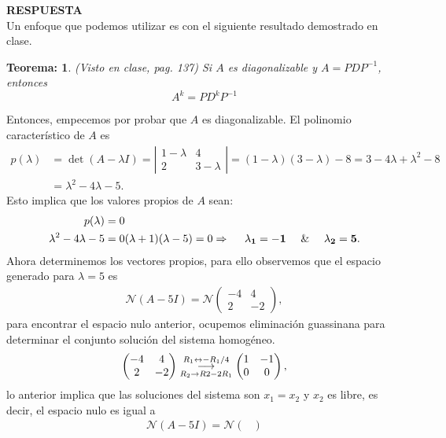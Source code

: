 \documentclass[11pt,letterpaper]{article}
\newcommand{\mcN}{\mathcal{N}}
\newcommand{\res}{\textbf{RESPUESTA}\\}
\newcommand{\grstep}[2][\relax]{%
   \ensuremath{\mathrel{
       {\mathop{\longrightarrow}\limits^{#2\mathstrut}_{
                                     \begin{subarray}{l} #1 \end{subarray}}}}}}
\newtheorem{thmt}{Teorema:}
\begin{document}
\begin{enumerate}
\res Un enfoque que podemos utilizar es con el siguiente resultado demostrado en clase.
\begin{framed}
    \begin{thmt} \label{t_potencia_diagonalizable}
	(Visto en clase, pag. 137) Si $A$ es diagonalizable y $A=PDP^{-1}$, entonces $$A^k=PD^kP^{-1}$$ 
    \end{thmt}
\end{framed}
Entonces, empecemos por probar que $A$ es diagonalizable. El polinomio característico de $A$ es
\begin{align*}
p(\lambda) &= \det (A-\lambda I)=\left|\begin{array}{cc}
1-\lambda &4 \\
2& 3-\lambda
\end{array} \right|=(1-\lambda)(3-\lambda)-8=3-4\lambda+\lambda^2-8 \\
&=\lambda^2 - 4\lambda -5.
\end{align*}
Esto implica que los valores propios de $A$ sean:
\begin{align*}
p(\lambda)&=0\\
\lambda^2 - 4\lambda -5 & = 0
(\lambda +1)(\lambda-5)=0 \Rightarrow \ \ \ \ \bf \lambda_1 =-1 \ \ \ \ \&\ \ \ \ \lambda_2=5.
\end{align*}
Ahora determinemos los vectores propios, para ello observemos que el espacio generado para $\lambda=5$ es
\begin{align*}
\mcN (A-5I)=\mcN\begin{pmatrix}
-4 & 4 \\
2 & -2 
\end{pmatrix},
\end{align*}
para encontrar el espacio nulo anterior, ocupemos eliminación guassinana para determinar el conjunto solución del sistema homogéneo. 
\begin{align*}
\begin{pmatrix}
-4 & 4 \\
2 & -2 
\end{pmatrix}%
\grstep[R_2\rightarrow R2-2R_1]{R_1 \leftrightarrow -R_1/4}
%
\begin{pmatrix}
1 & -1 \\
0 & 0 
\end{pmatrix},
\end{align*}
lo anterior implica que las soluciones del sistema son $x_1=x_2$ y $x_2$ es libre, es decir, el espacio nulo es igual a 
\begin{align*}
\mcN (A-5I)=\mcN\begin{pmatrix}

\end{pmatrix}
\end{align*}
\end{enumerate}
\end{document}
